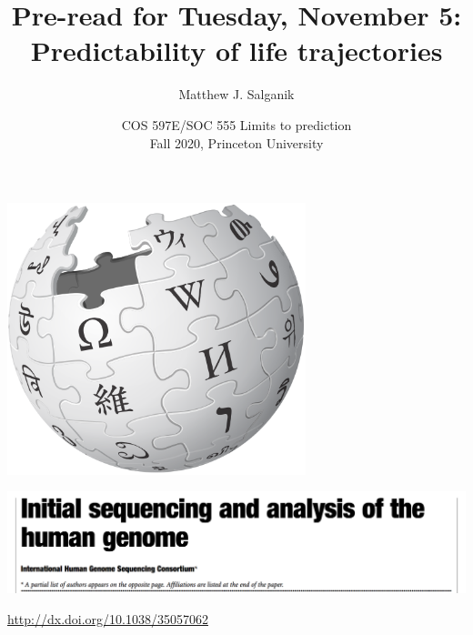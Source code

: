 \documentclass[aspectratio=169]{beamer}
\title[]{Pre-read for Tuesday, November 5:\\Predictability of life trajectories}
\author[]{Matthew J. Salganik}
\institute[]{}
\date[]{COS 597E/SOC 555 Limits to prediction\\Fall 2020, Princeton University}
\begin{document}
\frame{\titlepage}
\begin{frame}

\begin{center}
\includegraphics[width=0.65\textwidth]{figures/wikipedia_logo}
\end{center}

\end{frame}
\begin{frame}

\begin{center}
\includegraphics[width=\textwidth]{figures/lander_initial_2001_title}
\end{center}

\vfill
{\tiny \url{http://dx.doi.org/10.1038/35057062}}

\end{frame}
\end{document}
